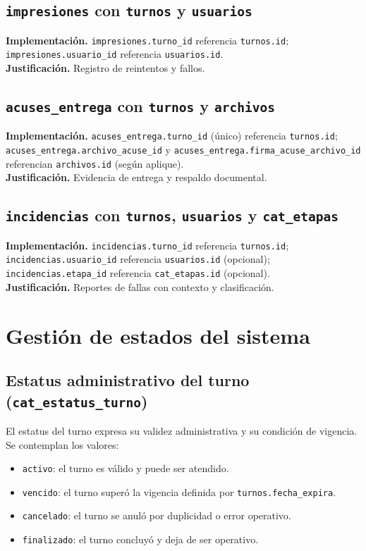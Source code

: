 \documentclass[12pt,a4paper]{article}
\begin{document}
\subsection{\texttt{impresiones} con \texttt{turnos} y \texttt{usuarios}}
\textbf{Implementación.} \texttt{impresiones.turno\_id} referencia \texttt{turnos.id}; \texttt{impresiones.usuario\_id} referencia \texttt{usuarios.id}.\\
\textbf{Justificación.} Registro de reintentos y fallos.

\subsection{\texttt{acuses\_entrega} con \texttt{turnos} y \texttt{archivos}}
\textbf{Implementación.} \texttt{acuses\_entrega.turno\_id} (único) referencia \texttt{turnos.id}; \texttt{acuses\_entrega.archivo\_acuse\_id} y \texttt{acuses\_entrega.firma\_acuse\_archivo\_id} referencian \texttt{archivos.id} (según aplique).\\
\textbf{Justificación.} Evidencia de entrega y respaldo documental.

\subsection{\texttt{incidencias} con \texttt{turnos}, \texttt{usuarios} y \texttt{cat\_etapas}}
\textbf{Implementación.} \texttt{incidencias.turno\_id} referencia \texttt{turnos.id}; \texttt{incidencias.usuario\_id} referencia \texttt{usuarios.id} (opcional); \texttt{incidencias.etapa\_id} referencia \texttt{cat\_etapas.id} (opcional).\\
\textbf{Justificación.} Reportes de fallas con contexto y clasificación.

\section{Gestión de estados del sistema}

\subsection{Estatus administrativo del turno (\texttt{cat\_estatus\_turno})}

El estatus del turno expresa su validez administrativa y su condición de vigencia. Se contemplan los valores:
\begin{itemize}
  \item \texttt{activo}: el turno es válido y puede ser atendido.
  \item \texttt{vencido}: el turno superó la vigencia definida por \texttt{turnos.fecha\_expira}.
  \item \texttt{cancelado}: el turno se anuló por duplicidad o error operativo.
  \item \texttt{finalizado}: el turno concluyó y deja de ser operativo.
\end{itemize}
\end{document}

